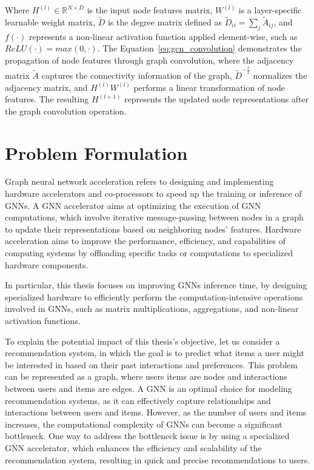 \documentclass[11pt,a4paper,twocolumn]{article}
\begin{document}
Where $H^{(l)} \in \mathbb{R} ^{N \times D}$ is the input node features matrix, $W^{(l)}$ is a layer-specific learnable weight matrix, $\tilde{D}$ is the degree matrix defined as $\tilde{D}_{ii} = \sum_{j} \tilde{A}_{ij}$, and $f(\cdot)$ represents a non-linear activation function applied element-wise, such as $ReLU(\cdot) = max(0, \cdot)$.
The Equation~\ref{eq:gcn_convolution} demonstrates the propagation of node features through graph convolution, where the adjacency matrix $\tilde{A}$ captures the connectivity information of the graph, $\tilde{D}^{-\tfrac{1}{2}}$ normalizes the adjacency matrix, and $H^{(l)}  W^{(l)}$ performs a linear transformation of node features.
The resulting $H^{(l+1)}$ represents the updated node representations after the graph convolution operation.


\section{Problem Formulation}
\label{sec:problem-formulation}%

Graph neural network acceleration refers to designing and implementing hardware accelerators and co-processors to speed up the training or inference of GNNs.
A GNN accelerator aims at optimizing the execution of GNN computations, which involve iterative message-passing between nodes in a graph to update their representations based on neighboring nodes' features.
Hardware acceleration aims to improve the performance, efficiency, and capabilities of computing systems by offloading specific tasks or computations to specialized hardware components.

In particular, this thesis focuses on improving GNNs inference time, by designing specialized hardware to efficiently perform the computation-intensive operations involved in GNNs, such as matrix multiplications, aggregations, and non-linear activation functions.

To explain the potential impact of this thesis's objective, let us consider a recommendation system, in which the goal is to predict what items a user might be interested in based on their past interactions and preferences.
This problem can be represented as a graph, where users items are nodes and interactions between users and items are edges.
A GNN is an optimal choice for modeling recommendation systems, as it can effectively capture relationships and interactions between users and items.
However, as the number of users and items increases, the computational complexity of GNNs can become a significant bottleneck.
One way to address the bottleneck issue is by using a specialized GNN accelerator, which enhances the efficiency and scalability of the recommendation system, resulting in quick and precise recommendations to users.
\end{document}
